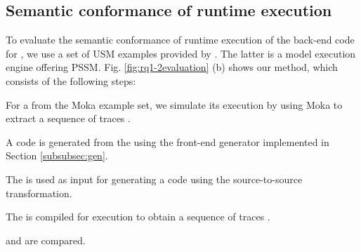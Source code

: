 




\subsection{Semantic conformance of runtime execution}
\label{subsec:exp2}

To evaluate the semantic conformance of runtime execution of the back-end code for , we use a set of USM examples provided by  \cite{moka}. 
The latter is a model execution engine offering PSSM. 
Fig. \ref{fig:rq1-2evaluation} (b) shows our method, which consists of the following steps:


\begin{description}[\footnotesize]
	\item[Step 1] For a  from the Moka example set, we simulate its execution by using Moka to extract a sequence of traces .
	
	\item[Step 2] A  code is generated from the  using the front-end generator implemented in Section \ref{subsubsec:gen}.
	
	\item[Step 3] The  is used as input for generating a  code using the source-to-source transformation.
	
	\item[Step 4] The  is compiled for execution to obtain a sequence of traces .
	
	\item[Step 5]  and  are compared.  
\end{description}

